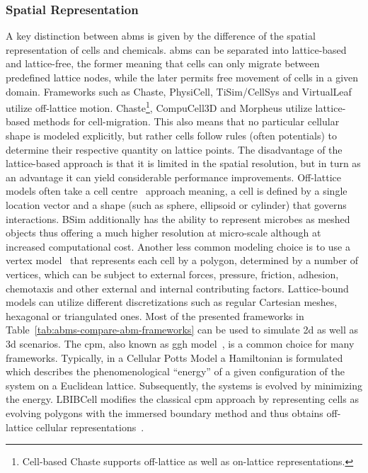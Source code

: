 %
\subsubsection*{Spatial Representation}
\label{subsec:abms-spatial-representation}\noindent
A key distinction between \acp{abm} is given by the difference of the spatial
representation of cells and chemicals.
\acp{abm} can be separated into lattice-based and lattice-free, the former meaning that
cells can only migrate between predefined lattice nodes, while the later permits free
movement of cells in a given domain.
Frameworks such as Chaste, PhysiCell, TiSim/CellSys and VirtualLeaf utilize off-lattice motion.
Chaste\footnote{Cell-based Chaste supports off-lattice as well as on-lattice
representations.}, CompuCell3D and Morpheus utilize lattice-based methods for cell-migration.
This also means that no particular cellular shape is modeled explicitly, but rather cells
follow rules (often potentials) to determine their respective quantity on lattice points.
The disadvantage of the lattice-based approach is that it is limited in the spatial
resolution, but in turn as an advantage it can yield considerable performance improvements.
Off-lattice models often take a cell centre~\cite{Drasdo2007}
approach meaning, a cell is defined by a single location vector and a shape (such as
sphere, ellipsoid or cylinder) that governs interactions.
BSim additionally has the ability to represent microbes as meshed objects thus offering a
much higher resolution at micro-scale although at increased computational cost.
Another less common modeling choice is to use a vertex
model~\cite{Nagai2001,Smith2006} that represents
each cell by a polygon, determined by a number of vertices, which can be subject to
external forces, pressure, friction, adhesion, chemotaxis and other external and internal
contributing factors.
Lattice-bound models can utilize different discretizations such as regular Cartesian
meshes, hexagonal or triangulated ones.
Most of the presented frameworks in Table~\ref{tab:abms-compare-abm-frameworks} can be
used to simulate \ac{2d} as well as \ac{3d} scenarios.
%
%
The \acl{cpm}, also known as \ac{ggh}
model~\cite{Graner1992,Savill1997},
is a common choice for many frameworks.
Typically, in a Cellular Potts Model a Hamiltonian is formulated which describes the
phenomenological “energy” of a given configuration of the system on a Euclidean lattice.
Subsequently, the systems is evolved by minimizing the energy.
LBIBCell modifies the classical \ac{cpm} approach by representing cells as evolving
polygons with the immersed boundary method and thus obtains off-lattice cellular
representations~\cite{Drasdo2007,Peskin2002}.
%
